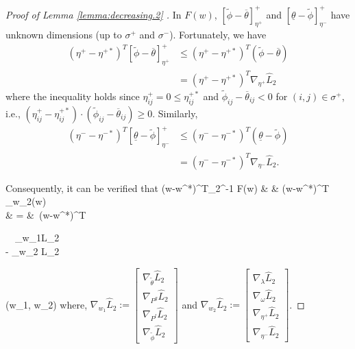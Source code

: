 \begin{proof}[Proof of Lemma \ref{lemma:decreasing.2} ]
	In $F(w)$,  $[\tilde\phi-\overline \theta]^+_{\eta^+}$ and $[\underline \theta-\tilde\phi]^+_{\eta^-} $ have unknown dimensions (up to $\sigma^+$ and $\sigma^-$). Fortunately, we have 
	\begin{align}
	(\eta^+-\eta^{+*})^T[\tilde\phi-\overline \theta]^+_{\eta^+}&\le(\eta^+-\eta^{+*})^T(\tilde\phi-\overline \theta)\nonumber\\
	&=(\eta^+-\eta^{+*})^T\nabla_{\eta^+} \hat L_2\nonumber
	\end{align}
	where the inequality holds since $\eta_{ij}^{+}=0\le \eta_{ij}^{+*}$ and $\tilde\phi_{ij}-\overline \theta_{ij} < 0$ for $(i,j)\in \sigma^+$, i.e., $(\eta_{ij}^+-\eta_{ij}^{+*}) \cdot (\tilde{\phi}_{ij}-\overline{\theta}_{ij})\ge0$. Similarly, 
	\begin{align}
	(\eta^--\eta^{-*})^T[\underline \theta-\tilde\phi]^+_{\eta^-}&\le(\eta^--\eta^{-*})^T(\underline \theta-\tilde\phi) \nonumber\\
	& = (\eta^--\eta^{-*})^T\nabla_{\eta^-} \hat L_2.\nonumber
	\end{align}
	
	Consequently, it can be verified that 
	\bqn
	(w-w^*)^T\Gamma_2^{-1} F(w) & \!\!\!\! \le \!\!\!\! & (w-w^*)^T \nabla_{w}_2(w) \nonumber\\
	& \!\!\!\!= \!\!\!\! &\ 
	(w-w^*)^T\begin{bmatrix} \ \ \nabla_{w_1}\hat L_2 \\ - \nabla_{w_2} \hat L_2 \end{bmatrix}\!
	(w_1, w_2)
	\eqn
	where, $\nabla_{w_1} \hat{L}_2 := \begin{bmatrix}
	\nabla_{\tilde\theta} \hat L_2 \\
	\nabla_{P^g} \hat L_2 \\
	\nabla_{P^l} \hat L_2 \\
	\nabla_{\tilde{\phi}} \hat L_2 
	\end{bmatrix}$   and $\nabla_{w_2} \hat{L}_2 := \begin{bmatrix}
	\nabla_{\lambda} \hat L_2 \\
	\nabla_{\omega} \hat L_2\\
	\nabla_{\eta^+} \hat L_2\\
	\nabla_{\eta^-} \hat L_2
	\end{bmatrix}$.  
	

\end{proof}
